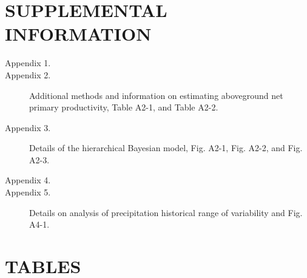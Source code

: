 \documentclass[fleqn,10pt,lineno]{wlpeerj} %
\begin{document}
\hypertarget{supplemental-information}{%
\section{SUPPLEMENTAL INFORMATION}\label{supplemental-information}}

\begin{description}
\item [Appendix 1.] 
\item [Appendix 2.] Additional methods and information on estimating aboveground net primary productivity, Table A2-1, and Table A2-2.
\item [Appendix 3.] Details of the hierarchical Bayesian model, Fig. A2-1, Fig. A2-2, and Fig. A2-3.
\item [Appendix 4.] 
\item [Appendix 5.] Details on analysis of precipitation historical range of variability and Fig. A4-1.
\end{description}

\newpage{}

\hypertarget{tables}{%
\section{TABLES}\label{tables}}
\end{document}
